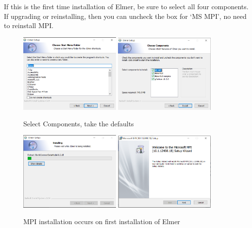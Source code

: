If this is the first time installation of Elmer, be sure to select all four components.  If upgrading or reinstalling, then you can uncheck the box for `MS MPI', no need to reinstall MPI.

\begin{figure}[H]
\begin{center}
\includegraphics[width=0.45\textwidth]{installer-7}
\includegraphics[width=0.45\textwidth]{installer-8}
\caption{Select Components, take the defaults}\label{fg:installer-7}
\end{center}
\end{figure}

\begin{figure}[H]
\begin{center}
\includegraphics[width=0.45\textwidth]{installer-9}
\includegraphics[width=0.45\textwidth]{mpi-1}
\caption{MPI installation occurs on first installation of Elmer}\label{fg:installer-9}
\end{center}
\end{figure}

